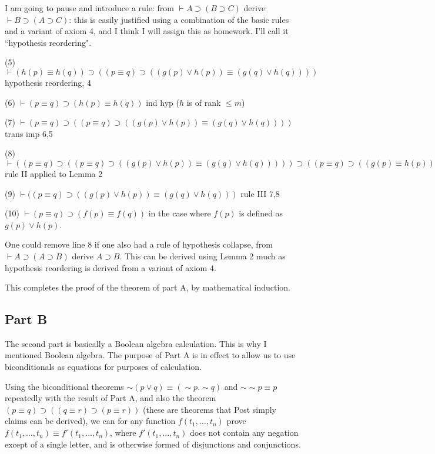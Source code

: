 \documentclass[12pt]{article}
\begin{document}
I am going to pause and introduce a rule:  from $\vdash A \supset (B \supset C)$ derive $\vdash B \supset (A \supset C)$:  this is easily justified using
a combination of the basic rules and a variant of axiom 4, and I think I will assign this as homework.  I'll call it ``hypothesis reordering".

(5) $\vdash (h(p) \equiv h(q)) \supset ((p \equiv q) \supset ((g(p) \vee h(p)) \equiv (g(q) \vee h(q))))$  hypothesis reordering, 4

(6)  $\vdash (p \equiv q) \supset (h(p) \equiv h(q))$  ind hyp ($h$ is of rank $\leq m$)

(7) $\vdash (p \equiv q) \supset ((p \equiv q) \supset ((g(p) \vee h(p)) \equiv (g(q) \vee h(q))))$  trans imp 6,5

(8) $\vdash ((p \equiv q) \supset ((p \equiv q) \supset ((g(p) \vee h(p)) \equiv (g(q) \vee h(q))))) \supset  ((p \equiv q) \supset ((g(p) \equiv h(p)) \equiv (g(q) \vee h(q)))) $ rule II applied to Lemma 2

(9) $\vdash ((p \equiv q) \supset ((g(p) \vee h(p)) \equiv (g(q) \vee h(q)))$ rule III 7,8

(10) $\vdash (p \equiv q) \supset (f(p) \equiv f(q))$ in the case where $f(p)$ is defined as $g(p) \vee h(p)$.


One could remove line 8 if one also had a rule of hypothesis collapse, from $\vdash A \supset (A \supset B)$ derive $A \supset B$.  This can be derived using Lemma 2 much as hypothesis reordering is derived
from a variant of axiom 4.

This completes the proof of the theorem of part A, by mathematical induction.

\subsection{Part B}

The second part is basically a Boolean algebra calculation.  This is why I mentioned Boolean algebra.  The purpose of Part A is in effect to allow us to use
biconditionals as equations for purposes of calculation.

Using the biconditional theorems $\sim (p \vee q) \equiv (\sim p.\sim q)$ and $\sim \sim p \equiv p$ repeatedly with the result of Part A, and also
the theorem $(p \equiv q) \supset ((q \equiv r) \supset (p\equiv r))$ (these are theorems that Post simply claims can be derived), we can for any function
$f(t_1,\ldots,t_n)$ prove $f(t_1,\ldots,t_n) \equiv f'(t_1,\ldots,t_n)$, where $f'(t_1,\ldots,t_n)$ does not contain any negation except of a single letter, and is otherwise
formed of disjunctions and conjunctions.
\end{document}
